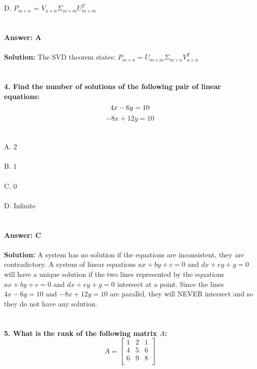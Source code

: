 \documentclass[prl,twocolumn,showpacs,preprintnumbers,superscriptaddress]{revtex4}
\theoremstyle{plain}
\theoremstyle{definition}
\begin{document}
\begin{widetext}
{\\
\\
D. $P_{m \times n}$ = $V_{n \times n}\Sigma_{m \times m} U^T_{m \times m}$
\\
\\
\\
\textbf{Answer: A}
\\
\\
\textbf{Solution:} 
The SVD theorem states: $P_{m \times n} = U_{m \times m}\Sigma_{m \times n} V^T_{n \times n}$
\\
\\
\\
\textbf{4. Find the number of solutions of the following pair of linear equations:} 
\\
\begin{equation}
   4x - 6y = 10 {}\nonumber \\
\end{equation}
\begin{equation}
  -8x + 12y = 10 {}\nonumber
\end{equation}
\\
\\
A. $2$\\
\\
B. $1$\\
\\
C. $0$\\
\\
D. Infinite
\\
\\
\\
\textbf{Answer: C}
\\
\\
\textbf{Solution:} 
A system has no solution if the equations are inconsistent, they are contradictory. A system of linear equations $ax + by + c = 0$ and $dx + ey + g = 0$ will have a unique solution if the two lines represented by the equations $ax + by + c = 0$ and $dx + ey + g = 0$ intersect at a point. Since the lines $4x - 6y = 10$ and $-8x + 12y = 10$ are parallel, they will NEVER intersect and so they do not have any solution.
\\
\\
\\
\textbf{5. What is the rank of the following matrix $A$:} 
\\
\[
A = \begin{bmatrix}    1 & 2 & 1 \\    4 & 5 & 6 \\ 6 & 9 & 8   \\ \end{bmatrix}
\]}
\end{widetext}
\end{document}
